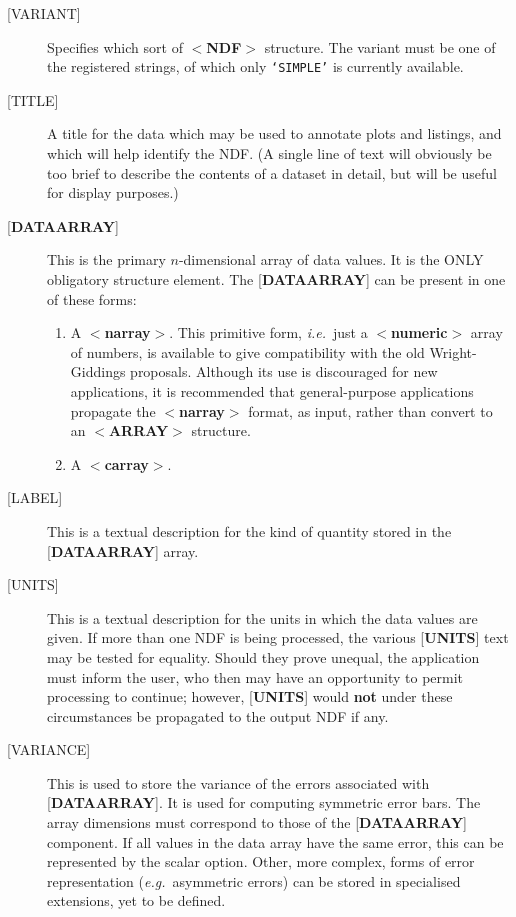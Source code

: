 \documentclass[twoside,11pt]{article}
\renewcommand{\_}{\texttt{\symbol{95}}}
\begin{document}
\begin{description}
\item [{[}VARIANT{]}]  Specifies which
sort of $<${\bf NDF}$>$ structure.  The variant
must be one
of the registered strings, of which only {\tt `SIMPLE'} is currently
available.
\item [{[}TITLE{]}]  A title for the data which
may be used to annotate plots and
listings, and which will help identify the NDF.
(A single line of text will obviously be too
brief to describe the contents
of a dataset in detail, but will
be useful for display purposes.)
\item [{[}{\bf DATA\_ARRAY}{]}]  This is the primary
$n$-dimensional array of data values.
It is the ONLY obligatory structure element.  The
{[}{\bf DATA\_ARRAY}{]} can be
present in one of these forms:
\begin{enumerate}
\item A $<${\bf narray}$>$.
This primitive form, {\it i.e.}\ just a $<${\bf numeric}$>$ array of numbers,
is available to give compatibility with the old Wright-Giddings proposals.
Although its
use is discouraged for new applications, it
is recommended that general-purpose applications
propagate the $<${\bf narray}$>$ format, as input,
rather than convert to an
\mbox{$<${\bf ARRAY}$>$} structure.
\item A $<${\bf c\_array}$>$.
\end{enumerate}
\item [{[}LABEL{]}]  This is a textual description for the kind of quantity
stored in the {[}{\bf DATA\_ARRAY}{]} array.
\item [{[}UNITS{]}]  This is a textual description for the units in which the
data values are given. If more than one NDF is being processed, the various
{[}{\bf UNITS}{]} text may be tested for equality.  Should they prove
unequal, the
application must inform the user, who then may have an opportunity to
permit processing to continue;  however, {[}{\bf UNITS}{]}
would {\bf not} under these circumstances be
propagated to the output NDF if any.
\item [{[}VARIANCE{]}]  This is used to store the variance of the
errors associated with {[}{\bf DATA\_ARRAY}{]}.
It is used for computing symmetric error bars.
The array dimensions must correspond to those of the
{[}{\bf DATA\_ARRAY}{]} component.
If all values in the data array have the same error, this can
be represented by the scalar option.
Other, more complex, forms of error representation
({\it e.g.}\  asymmetric errors)
can be stored in specialised extensions, yet to be defined.

\end{description}
\end{document}
